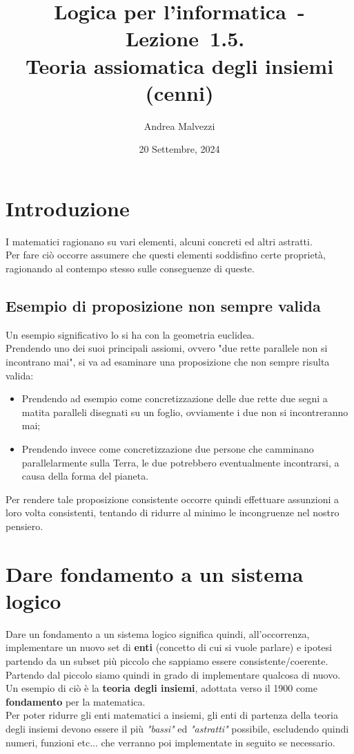 \documentclass[12pt]{article}
\author{Andrea Malvezzi}
\title{\textbf{Logica per l'informatica~-~Lezione~1.5.\\Teoria assiomatica degli insiemi (cenni)}}
\date{20 Settembre, 2024}
\begin{document}
\maketitle
\pagebreak
\tableofcontents
\pagebreak
\section{Introduzione}
I matematici ragionano su vari elementi, alcuni concreti ed altri astratti.\\
Per fare ciò occorre assumere che questi elementi soddisfino certe proprietà, ragionando al contempo stesso sulle conseguenze di queste.
\subsection{Esempio di proposizione non sempre valida}
Un esempio significativo lo si ha con la geometria euclidea.\\
Prendendo uno dei suoi principali assiomi, ovvero "due rette parallele non si incontrano mai", si va ad esaminare una proposizione che non sempre risulta valida:
\begin{itemize}
    \item Prendendo ad esempio come concretizzazione delle due rette due segni a matita paralleli disegnati su un foglio, ovviamente i due non si incontreranno mai;
    \item Prendendo invece come concretizzazione due persone che camminano parallelarmente sulla Terra, le due potrebbero eventualmente incontrarsi, a causa della forma del pianeta.
\end{itemize}
Per rendere tale proposizione consistente occorre quindi effettuare assunzioni a loro volta consistenti, tentando di ridurre al minimo le incongruenze nel nostro pensiero.
\pagebreak
\section{Dare fondamento a un sistema logico}
Dare un fondamento a un sistema logico significa quindi, all'occorrenza, implementare un nuovo set di \textbf{enti} (concetto di cui si vuole parlare) e ipotesi partendo da un subset più piccolo che sappiamo essere consistente/coerente.\\
Partendo dal piccolo siamo quindi in grado di implementare qualcosa di nuovo.\\
Un esempio di ciò è la \textbf{teoria degli insiemi}, adottata verso il 1900 come \textbf{fondamento} per la matematica.\\
Per poter ridurre gli enti matematici a insiemi, gli enti di partenza della teoria degli insiemi devono essere il più \textit{"bassi"} ed \textit{"astratti"} possibile, escludendo quindi numeri, funzioni etc... che verranno poi implementate in seguito se necessario.
\end{document}
